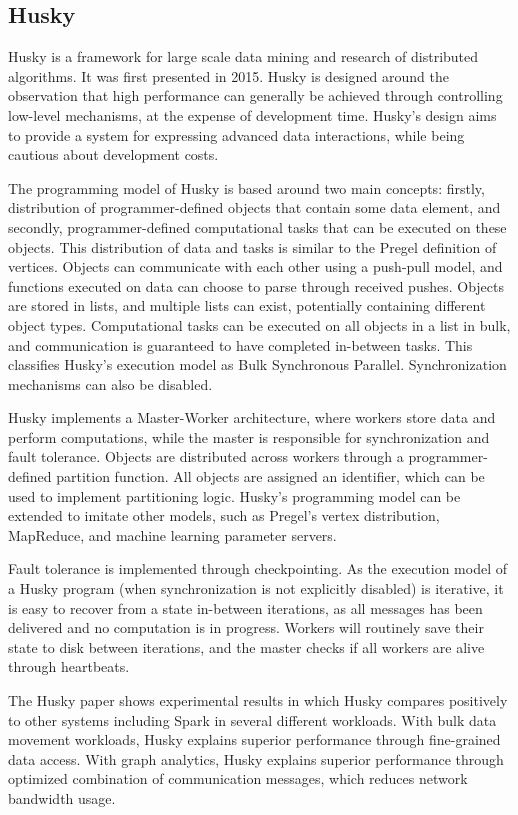 \documentclass{uit-report}
\begin{document}
\subsection{Husky}
Husky \cite{husky}\cite{husky_website} is a framework for large scale data mining and research of distributed algorithms. It was first presented in 2015. Husky is designed around the observation that high performance can generally be achieved through controlling low-level mechanisms, at the expense of development time. Husky's design aims to provide a system for expressing advanced data interactions, while being cautious about development costs.

The programming model of Husky is based around two main concepts: firstly, distribution of programmer-defined objects that contain some data element, and secondly, programmer-defined computational tasks that can be executed on these objects. This distribution of data and tasks is similar to the Pregel definition of vertices. Objects can communicate with each other using a push-pull model, and functions executed on data can choose to parse through received pushes. Objects are stored in lists, and multiple lists can exist, potentially containing different object types. Computational tasks can be executed on all objects in a list in bulk, and communication is guaranteed to have completed in-between tasks. This classifies Husky's execution model as Bulk Synchronous Parallel. Synchronization mechanisms can also be disabled.

Husky implements a Master-Worker architecture, where workers store data and perform computations, while the master is responsible for synchronization and fault tolerance. Objects are distributed across workers through a programmer-defined partition function. All objects are assigned an identifier, which can be used to implement partitioning logic. Husky's programming model can be extended to imitate other models, such as Pregel's vertex distribution, MapReduce, and machine learning parameter servers.

Fault tolerance is implemented through checkpointing. As the execution model of a Husky program (when synchronization is not explicitly disabled) is iterative, it is easy to recover from a state in-between iterations, as all messages has been delivered and no computation is in progress. Workers will routinely save their state to disk between iterations, and the master checks if all workers are alive through heartbeats. 

The Husky paper shows experimental results in which Husky compares positively to other systems including Spark in several different workloads. With bulk data movement workloads, Husky explains superior performance through fine-grained data access. With graph analytics, Husky explains superior performance through optimized combination of communication messages, which reduces network bandwidth usage. 
\end{document}
